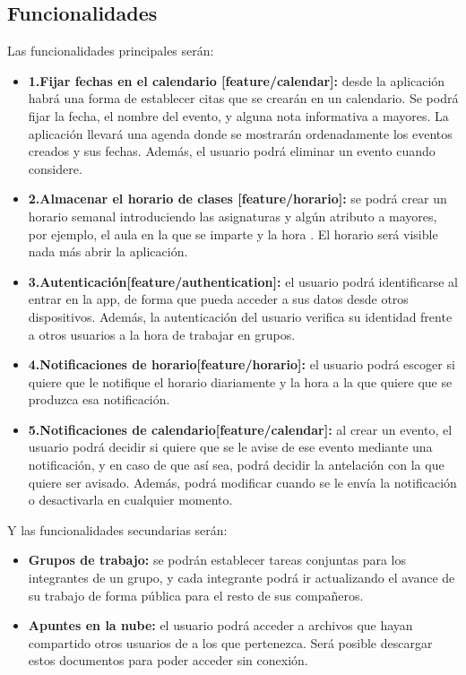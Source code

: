 \documentclass[a4paper,openright,12pt]{article}
\begin{document}
\subsection{Funcionalidades}
Las funcionalidades principales serán:
\begin{itemize}
\item \textbf{1.Fijar fechas en el calendario [feature/calendar]:} desde la aplicación habrá una forma de establecer citas que se crearán en un calendario. Se podrá fijar la fecha, el nombre del evento, y alguna nota informativa a mayores. La aplicación llevará una agenda donde se mostrarán ordenadamente los eventos creados y sus fechas. Además, el usuario podrá eliminar un evento cuando considere.

\item \textbf{2.Almacenar el horario de clases [feature/horario]:} se podrá crear un horario semanal introduciendo las asignaturas y algún atributo a mayores, por ejemplo, el aula en la que se imparte y la hora . El horario será visible nada más abrir la aplicación.

\item \textbf{3.Autenticación[feature/authentication]:} el usuario podrá identificarse al entrar en la app, de forma que pueda acceder a sus datos desde otros dispositivos. Además, la autenticación del usuario verifica su identidad frente a otros usuarios a la hora de trabajar en grupos.

\item \textbf{4.Notificaciones de horario[feature/horario]:} el usuario podrá escoger si quiere que le notifique el horario diariamente y la hora a la que quiere que se produzca esa notificación.

\item \textbf{5.Notificaciones de calendario[feature/calendar]:} al crear un evento, el usuario podrá decidir si quiere que se le avise de ese evento mediante una notificación, y en caso de que así sea, podrá decidir la antelación con la que quiere ser avisado. Además, podrá modificar cuando se le envía la notificación o desactivarla en cualquier momento.


\end{itemize}

Y las funcionalidades secundarias serán:
\begin{itemize}

\item \textbf{Grupos de trabajo:} se podrán establecer tareas conjuntas para los integrantes de un grupo, y cada integrante podrá ir actualizando el avance de su trabajo de forma pública para el resto de sus compañeros.

\item \textbf{Apuntes en la nube:} el usuario podrá acceder a archivos que hayan compartido otros usuarios de a los que pertenezca. Será posible descargar estos documentos para poder acceder sin conexión. 
\end{itemize}
\end{document}
